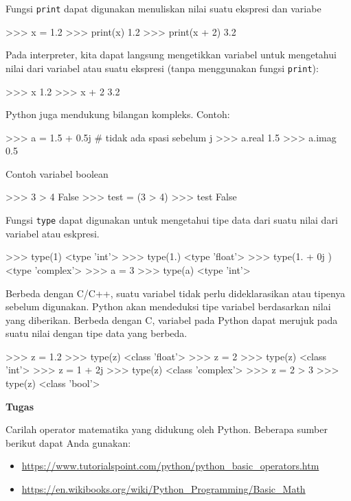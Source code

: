 Fungsi \texttt{print} dapat digunakan menuliskan nilai suatu ekspresi dan variabe
\begin{pyconcode}
>>> x = 1.2
>>> print(x)
1.2
>>> print(x + 2)
3.2
\end{pyconcode}

Pada interpreter, kita dapat langsung mengetikkan variabel untuk mengetahui nilai
dari variabel atau suatu ekspresi (tanpa menggunakan fungsi \texttt{print}):
\begin{pyconcode}
>>> x
1.2
>>> x + 2
3.2
\end{pyconcode}

Python juga mendukung bilangan kompleks. Contoh:
\begin{pyconcode}
>>> a = 1.5 + 0.5j # tidak ada spasi sebelum j
>>> a.real
1.5
>>> a.imag
0.5
\end{pyconcode}

Contoh variabel boolean
\begin{pyconcode}
>>> 3 > 4
False
>>> test = (3 > 4)
>>> test
False
\end{pyconcode}

Fungsi \texttt{type} dapat digunakan untuk mengetahui tipe data dari
suatu nilai dari variabel atau eskpresi.
\begin{pyconcode}
>>> type(1)
<type 'int'>
>>> type(1.)
<type 'float'>
>>> type(1. + 0j )
<type 'complex'>
>>> a = 3
>>> type(a)
<type 'int'>
\end{pyconcode}

Berbeda dengan C/C++, suatu variabel tidak perlu dideklarasikan atau
tipenya sebelum digunakan. Python akan mendeduksi tipe variabel berdasarkan
nilai yang diberikan. Berbeda dengan C, variabel pada Python dapat merujuk
pada suatu nilai dengan tipe data yang berbeda.

\begin{pyconcode}
>>> z = 1.2
>>> type(z)
<class 'float'>
>>> z = 2
>>> type(z)
<class 'int'>
>>> z = 1 + 2j
>>> type(z)
<class 'complex'>
>>> z = 2 > 3
>>> type(z)
<class 'bool'>
\end{pyconcode}


\begin{mdframed}[backgroundcolor=myframebg]
\textbf{Tugas}

Carilah operator matematika yang didukung oleh Python.
Beberapa sumber berikut dapat Anda gunakan:
\begin{itemize}
\item \url{https://www.tutorialspoint.com/python/python_basic_operators.htm}
\item \url{https://en.wikibooks.org/wiki/Python_Programming/Basic_Math}
\end{itemize}
\end{mdframed}

